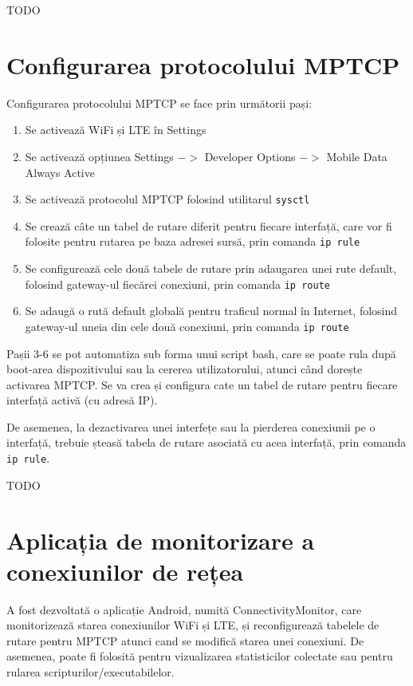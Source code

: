 TODO

\section{Configurarea protocolului MPTCP}

Configurarea protocolului MPTCP se face prin următorii pași:
\begin{enumerate}
	\item Se activează WiFi și LTE în Settings
	\item Se activează opțiunea Settings $->$ Developer Options $->$ Mobile Data Always Active
	\item Se activează protocolul MPTCP folosind utilitarul \texttt{sysctl}
	\item Se crează câte un tabel de rutare diferit pentru fiecare interfață, care vor fi folosite pentru rutarea pe baza adresei sursă, prin comanda \texttt{ip rule}
	\item Se configurează cele două tabele de rutare prin adaugarea unei rute default, folosind gateway-ul fiecărei conexiuni, prin comanda \texttt{ip route} 
	\item Se adaugă o rută default globală pentru traficul normal în Internet, folosind gateway-ul uneia din cele două conexiuni, prin comanda \texttt{ip route}
\end{enumerate}
Pașii 3-6 se pot automatiza sub forma unui script bash, care se poate rula după boot-area dispozitivului sau la cererea utilizatorului, atunci când dorește activarea MPTCP.  Se va crea și configura cate un tabel de rutare pentru fiecare interfață activă (cu adresă IP).

De asemenea, la dezactivarea unei interfețe sau la pierderea conexiunii pe o interfață, trebuie șteasă tabela de rutare asociată cu acea interfață, prin comanda \texttt{ip rule}. 

TODO

\section{Aplicația de monitorizare a conexiunilor de rețea}

A fost dezvoltată o aplicație Android, numită ConnectivityMonitor,  care monitorizează starea conexiunilor WiFi și LTE, și reconfigurează tabelele de rutare pentru MPTCP atunci cand se modifică starea unei conexiuni. De asemenea, poate fi folosită pentru vizualizarea statisticilor colectate sau pentru rularea scripturilor/executabilelor. 

